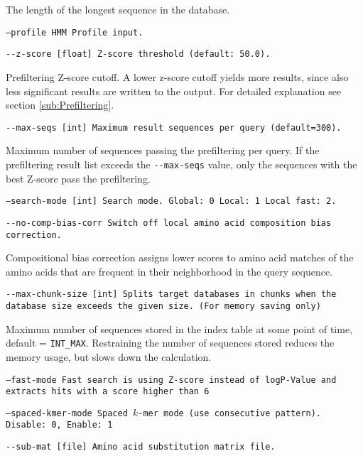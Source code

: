 \documentclass[11pt,a4paper]{scrreprt}
\begin{document}
The length of the longest sequence in the database.

\texttt{\small --profile HMM Profile input.}{\small \par}

\texttt{\small -{}-z-score {[}float{]} Z-score threshold (default: 50.0).}{\small \par}

Prefiltering Z-score cutoff. A lower z-score cutoff yields more results, since also less significant results are written to the output. For detailed explanation see section \ref{sub:Prefiltering}.

\texttt{\small -{}-max-seqs {[}int{]} Maximum result sequences per query (default=300).}{\small \par}

Maximum number of sequences passing the prefiltering per query. If the prefiltering result list exceeds the \texttt{-{}-max-seqs} value, only the sequences with the best Z-score pass the prefiltering.

\texttt{\small --search-mode {[}int{]}  Search mode. Global: 0 Local: 1 Local fast: 2.}{\small \par}

\texttt{\small -{}-no-comp-bias-corr Switch off local amino acid composition bias correction.}{\small \par}

Compositional bias correction assigns lower scores to amino acid matches of the amino acids that are frequent in their neighborhood in the query sequence.

\texttt{\small -{}-max-chunk-size {[}int{]} Splits target databases in chunks when the database size exceeds the given size. (For memory saving only)}{\small \par}

Maximum number of sequences stored in the index table at some point of time, default = \texttt{INT\_MAX}. Restraining the number of sequences stored reduces the memory usage, but slows down the calculation.

\texttt{\small --fast-mode Fast search is using Z-score instead of logP-Value and extracts hits with a score higher than 6}{\small \par}
 
\texttt{\small --spaced-kmer-mode       Spaced $k$-mer mode (use consecutive pattern). Disable: 0, Enable: 1}{\small \par}

\texttt{\small -{}-sub-mat {[}file{]} Amino acid substitution matrix file.}{\small \par}
\end{document}
